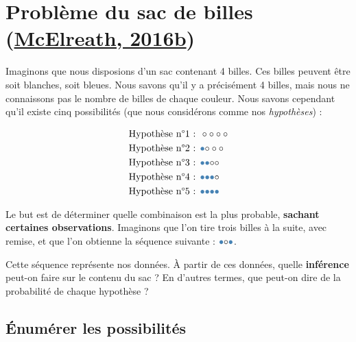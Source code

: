 \documentclass[
  a4paper,11pt,twoside,onecolumn,openright,final,oldfontcommands]{memoir}
\theoremstyle{definition}
\theoremstyle{definition}
\theoremstyle{definition}
\theoremstyle{definition}
\theoremstyle{remark}
\begin{document}
\hypertarget{probluxe8me-du-sac-de-billes-mcelreath_statistical_2016}{%
\section{\texorpdfstring{Problème du sac de billes (\protect\hyperlink{ref-mcelreath_statistical_2016}{McElreath, 2016b})}{Problème du sac de billes (McElreath, 2016b)}}\label{probluxe8me-du-sac-de-billes-mcelreath_statistical_2016}}

Imaginons que nous disposions d'un sac contenant 4 billes. Ces billes peuvent être soit blanches, soit bleues. Nous savons qu'il y a précisément 4 billes, mais nous ne connaissons pas le nombre de billes de chaque couleur. Nous savons cependant qu'il existe cinq possibilités (que nous considérons comme nos \emph{hypothèses}) :

\[
\begin{aligned}
&\text{Hypothèse n°1 : } \LARGE \circ \circ \circ \circ \\
&\text{Hypothèse n°2 : } \LARGE \color{steelblue}{\bullet} \color{black}{\circ} \circ \circ \\
&\text{Hypothèse n°3 : } \LARGE \color{steelblue}{\bullet} \color{steelblue}{\bullet} \color{black}{\circ} \circ \\
&\text{Hypothèse n°4 : } \LARGE \color{steelblue}{\bullet} \color{steelblue}{\bullet} \color{steelblue}{\bullet} \color{black}{\circ} \\
&\text{Hypothèse n°5 : } \LARGE \color{steelblue}{\bullet} \color{steelblue}{\bullet} \color{steelblue}{\bullet} \color{steelblue}{\bullet} \\
\end{aligned}
\]

Le but est de déterminer quelle combinaison est la plus probable, \textbf{sachant certaines observations}. Imaginons que l'on tire trois billes à la suite, avec remise, et que l'on obtienne la séquence suivante : \(\LARGE \color{steelblue}{\bullet} \color{black}{\circ} \color{steelblue}{\bullet}\).

Cette séquence représente nos données. À partir de ces données, quelle \textbf{inférence} peut-on faire sur le contenu du sac ? En d'autres termes, que peut-on dire de la probabilité de chaque hypothèse ?

\hypertarget{uxe9numuxe9rer-les-possibilituxe9s}{%
\subsection{Énumérer les possibilités}\label{uxe9numuxe9rer-les-possibilituxe9s}}
\end{document}
